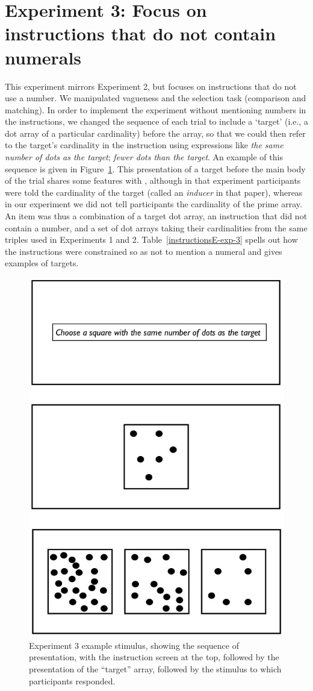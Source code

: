 \documentclass[ %
  graybox       %
 ,envcountchap  %
 ,sectrefs      %
]{svmono}
\begin{document}
\section{Experiment 3: Focus on instructions that do not contain numerals}
This experiment mirrors Experiment 2, but focuses on instructions that do not use a number. We manipulated vagueness and the selection task (comparison and matching). In order to implement the experiment without mentioning numbers in the instructions, we changed the sequence of each trial to include a `target' (i.e., a dot array of a particular cardinality) before the array, so that we could then refer to the target's cardinality in the instruction using expressions like \emph{the same number of dots as the target}; \emph{fewer dots than the target}. An example of this sequence is given in Figure~\ref{Experiment3examplestimulus}. This presentation of a target before the main body of the trial shares some features with \citeauthor[Experiment 2]{Izard20081221}, although in that experiment participants were told the cardinality of the target (called an \emph{inducer} in that paper), whereas in our experiment we did not tell participants the cardinality of the prime array. An item was thus a combination of a target dot array, an instruction that did not contain a number, and a set of dot arrays taking their cardinalities from the same triples used in Experiments 1 and 2. Table~\ref{instructionsE-exp-3} spells out how the instructions were constrained so as not to mention a numeral and gives examples of targets.

\begin{figure}[htbp]
\centering
\includegraphics[width=.5\textwidth]{figures/Ee3-flow.jpg}
\caption{Experiment 3 example stimulus, showing the sequence of presentation, with the instruction screen at the top, followed by the presentation of the ``target'' array, followed by the stimulus to which participants responded.}
\label{Experiment3examplestimulus}
\end{figure}
\end{document}
